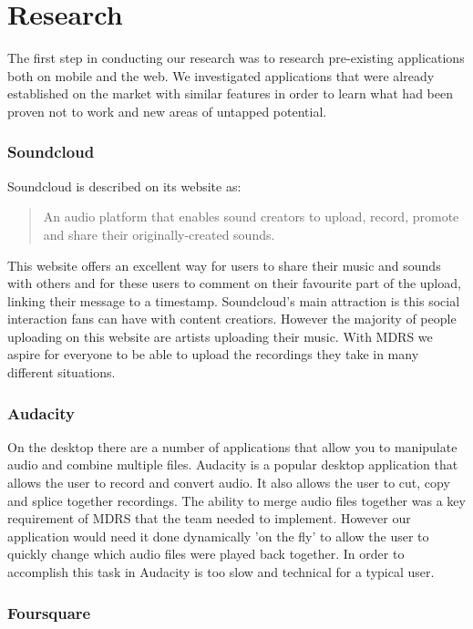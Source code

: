 \documentclass{l3proj}
\begin{document}
\chapter{Research}
\label{Research}

The first step in conducting our research was to research pre-existing applications both on mobile and the web. We investigated applications that were already established on the market with similar features in order to learn what had been proven not to work and new areas of untapped potential.

\subsection{Soundcloud}
Soundcloud\cite{soundcloud} is described on its website as:
\blockquote{An audio platform that enables sound creators to upload, record, promote and share their originally-created sounds.}
This website offers an excellent way for users to share their music and sounds with others and for these users to comment on their favourite part of the upload, linking their message to a timestamp. Soundcloud's main attraction is this social interaction fans can have with content creatiors. However the majority of people uploading on this website are artists uploading their music. With MDRS we aspire for everyone to be able to upload the recordings they take in many different situations.

\subsection{Audacity}

On the desktop there are a number of applications that allow you to manipulate audio and combine multiple files. Audacity is a popular desktop application that allows the user to record and convert audio. It also allows the user to cut, copy and splice together recordings. The ability to merge audio files together was a key requirement of MDRS that the team needed to implement. However our application would need it done dynamically 'on the fly' to allow the user to quickly change which audio files were played back together. In order to accomplish this task in Audacity\cite{audacity} is too slow and technical for a typical user.

\subsection{Foursquare}
\end{document}
